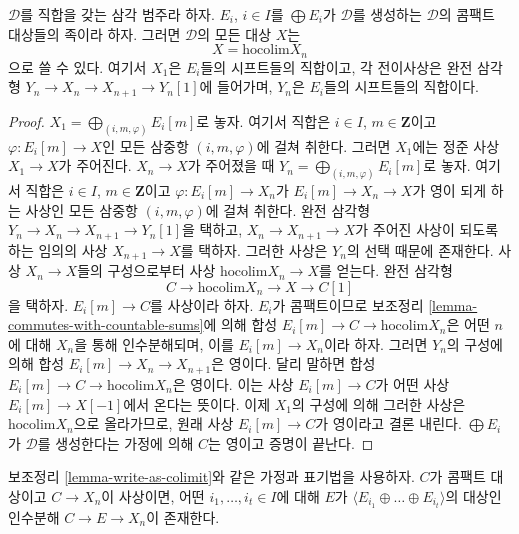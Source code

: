 \begin{lemma}
\label{lemma-write-as-colimit}
$\mathcal{D}$를 직합을 갖는 삼각 범주라 하자.
$E_i$, $i \in I$를 $\bigoplus E_i$가 $\mathcal{D}$를 생성하는
$\mathcal{D}$의 콤팩트 대상들의 족이라 하자. 그러면
$\mathcal{D}$의 모든 대상 $X$는
$$
X = \text{hocolim} X_n
$$
으로 쓸 수 있다. 여기서 $X_1$은 $E_i$들의 시프트들의 직합이고,
각 전이사상은 완전 삼각형
$Y_n \to X_n \to X_{n + 1} \to Y_n[1]$에 들어가며, $Y_n$은
$E_i$들의 시프트들의 직합이다.
\end{lemma}

\begin{proof}
$X_1 = \bigoplus_{(i, m, \varphi)} E_i[m]$로 놓자. 여기서 직합은
$i \in I$, $m \in \mathbf{Z}$이고 $\varphi : E_i[m] \to X$인 모든
삼중항 $(i, m, \varphi)$에 걸쳐 취한다. 그러면 $X_1$에는 정준 사상
$X_1 \to X$가 주어진다. $X_n \to X$가 주어졌을 때
$Y_n = \bigoplus_{(i, m, \varphi)} E_i[m]$로 놓자. 여기서 직합은
$i \in I$, $m \in \mathbf{Z}$이고 $\varphi : E_i[m] \to X_n$가
$E_i[m] \to X_n \to X$가 영이 되게 하는 사상인 모든 삼중항
$(i, m, \varphi)$에 걸쳐 취한다. 완전 삼각형
$Y_n \to X_n \to X_{n + 1} \to Y_n[1]$을 택하고,
$X_n \to X_{n + 1} \to X$가 주어진 사상이 되도록 하는 임의의 사상
$X_{n + 1} \to X$를 택하자. 그러한 사상은 $Y_n$의 선택 때문에
존재한다. 사상 $X_n \to X$들의 구성으로부터 사상
$\text{hocolim} X_n \to X$를 얻는다. 완전 삼각형
$$
C \to \text{hocolim} X_n \to X \to C[1]
$$
을 택하자. $E_i[m] \to C$를 사상이라 하자. $E_i$가 콤팩트이므로
보조정리 \ref{lemma-commutes-with-countable-sums}에 의해 합성
$E_i[m] \to C \to \text{hocolim} X_n$은 어떤 $n$에 대해 $X_n$을
통해 인수분해되며, 이를 $E_i[m] \to X_n$이라 하자. 그러면
$Y_n$의 구성에 의해 합성 $E_i[m] \to X_n \to X_{n + 1}$은 영이다.
달리 말하면 합성 $E_i[m] \to C \to \text{hocolim} X_n$은 영이다.
이는 사상 $E_i[m] \to C$가 어떤 사상 $E_i[m] \to X[-1]$에서
온다는 뜻이다. 이제 $X_1$의 구성에 의해 그러한 사상은
$\text{hocolim} X_n$으로 올라가므로, 원래 사상
$E_i[m] \to C$가 영이라고 결론 내린다. $\bigoplus E_i$가
$\mathcal{D}$를 생성한다는 가정에 의해 $C$는 영이고 증명이 끝난다.
\end{proof}

\begin{lemma}
\label{lemma-factor-through}
보조정리 \ref{lemma-write-as-colimit}와 같은 가정과 표기법을 사용하자.
$C$가 콤팩트 대상이고 $C \to X_n$이 사상이면, 어떤
$i_1, \ldots, i_t \in I$에 대해 $E$가
$\langle E_{i_1} \oplus \ldots \oplus E_{i_t} \rangle$의 대상인
인수분해 $C \to E \to X_n$이 존재한다.
\end{lemma}

